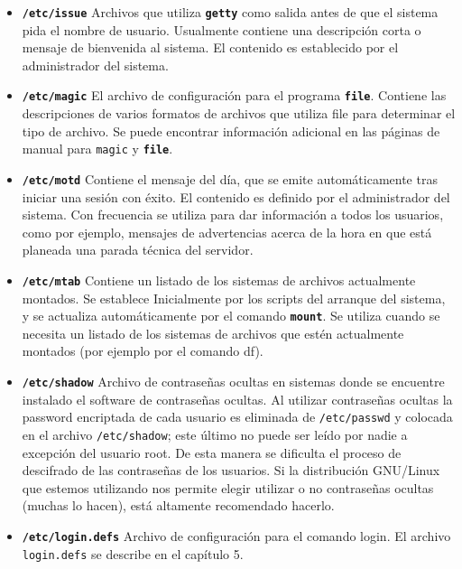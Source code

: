 \begin{itemize}
	\item \textbf{\texttt{/etc/issue}}
	 Archivos que utiliza \texttt{\textbf{getty}} como
	salida antes de que el sistema pida el nombre de usuario. Usualmente
	contiene una descripción corta o mensaje de bienvenida al sistema.  El
	contenido es establecido por el administrador del sistema.
	


	\item \textbf{\texttt{/etc/magic}}
	 El archivo de configuración para el programa
	\texttt{\textbf{file}}. Contiene las descripciones de varios formatos
	de archivos que utiliza file para determinar el tipo de archivo. Se
	puede encontrar información adicional en las páginas de manual
	para \texttt{magic} y \texttt{\textbf{file}}.
	


	\item \textbf{\texttt{/etc/motd}}
	 Contiene el mensaje del día, que se emite
	automáticamente  		tras iniciar una sesión con éxito. El
	contenido 	es definido por el 		administrador del
	sistema. Con frecuencia se utiliza para dar información a 	todos
	los usuarios, como por ejemplo, mensajes de advertencias acerca de la
	hora en que está planeada una parada técnica del servidor.
	


	\item \textbf{\texttt{/etc/mtab}}
	 Contiene un listado de los sistemas de archivos
	actualmente montados. Se establece Inicialmente por los scripts del
	arranque del sistema, y se actualiza automáticamente por el comando
	\texttt{\textbf{mount}}. Se utiliza cuando se necesita un listado de
	los sistemas de archivos que estén actualmente montados (por ejemplo por
	el comando df).  


	\item \textbf{\texttt{/etc/shadow}}
	 Archivo de contraseñas ocultas en sistemas donde se
	encuentre instalado el software de contraseñas ocultas.  Al utilizar
	contraseñas ocultas la password encriptada de cada usuario es eliminada
	de \texttt{/etc/passwd} y colocada en el archivo
	\texttt{/etc/shadow}; este último no 		puede
	ser leído por nadie a excepción del usuario root. De esta manera se
	dificulta el proceso de descifrado de las contraseñas de los usuarios.
	Si 		la distribución GNU/Linux que estemos utilizando nos
	permite elegir 			utilizar o no contraseñas ocultas
	(muchas lo hacen), está altamente 			recomendado
	hacerlo.  


	\item \textbf{\texttt{/etc/login.defs}}
	 Archivo de configuración para el comando login.  El
	archivo \texttt{login.defs} se describe en el capítulo 5.
	


\end{itemize}
